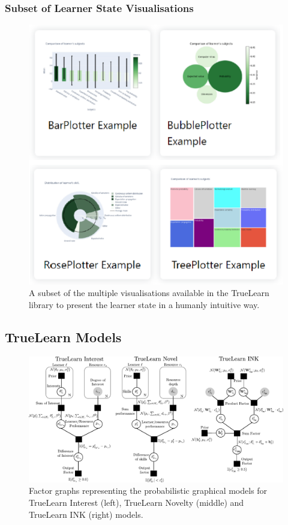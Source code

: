 \documentclass[letterpaper]{article} %
\begin{document}
\subsubsection{Subset of Learner State Visualisations}
\begin{figure}[h!]
\begin{center}
    \centerline{\includegraphics[width=\linewidth]{vis_plots.pdf}}
    \caption{A subset of the multiple visualisations available in the TrueLearn library to present the learner state in a humanly intuitive way.}
\end{center}
\end{figure}

\subsection{TrueLearn Models}

\begin{figure}[h]
\begin{center}
\centerline{\includegraphics[width=.75\linewidth]{TrueLearn_models.pdf}}
\caption{Factor graphs representing the probabilistic graphical models for TrueLearn Interest (left), TrueLearn Novelty (middle) and TrueLearn INK (right) models.}
\end{center}
\end{figure}
\end{document}
